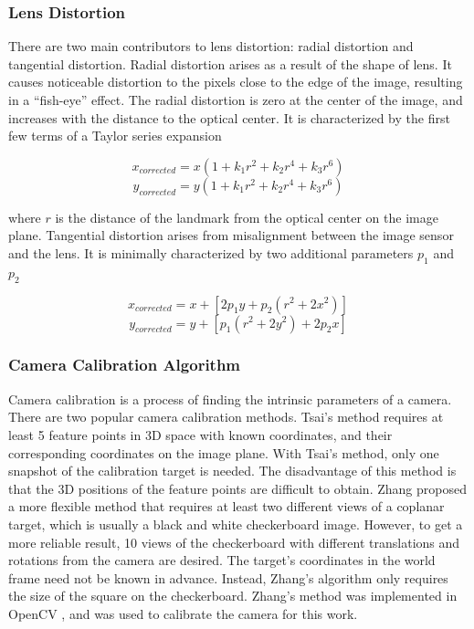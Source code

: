 \subsubsection{Lens Distortion}
There are two main contributors to lens distortion: radial distortion
and tangential distortion. Radial distortion arises as a result of the
shape of lens. It causes noticeable distortion to the pixels close to
the edge of the image, resulting in a ``fish-eye'' effect. The radial
distortion is zero at the center of the image, and increases with the
distance to the optical center. It is characterized by the first few
terms of a Taylor series expansion \cite{bradski_learning_2008}

\begin{equation}x_{corrected} = x(1+k_1r^2+k_2r^4+k_3r^6)\end{equation}
\begin{equation}y_{corrected} = y(1+k_1r^2+k_2r^4+k_3r^6)\end{equation}

\noindent where $r$ is the distance of the landmark from the optical
center on the image plane. Tangential distortion arises from
misalignment between the image sensor and the lens. It is minimally
characterized by two additional parameters $p_1$ and $p_2$
\cite{bradski_learning_2008}

\begin{equation}x_{corrected} = x+[2p_1y+p_2(r^2+2x^2)]\end{equation}
\begin{equation}y_{corrected} = y+[p_1(r^2+2y^2)+2p_2x]\end{equation}

\subsubsection{Camera Calibration Algorithm}
Camera calibration is a process of finding the intrinsic parameters of
a camera. There are two popular camera calibration methods. Tsai's
method \cite{tsai_efficient_1986} requires at least 5 feature points
in 3D space with known coordinates, and their corresponding
coordinates on the image plane. With Tsai's method, only one snapshot
of the calibration target is needed. The disadvantage of this method
is that the 3D positions of the feature points are difficult to
obtain. Zhang \cite{zhang_flexible_2000} proposed a more flexible
method that requires at least two different views of a coplanar
target, which is usually a black and white checkerboard image.
However, to get a more reliable result, 10 views of the checkerboard
with different translations and rotations from the camera are desired.
The target's coordinates in the world frame need not be known in
advance. Instead, Zhang's algorithm only requires the size of the
square on the checkerboard. Zhang's method was implemented in OpenCV
\cite{bradski_learning_2008}, and was used to calibrate the camera for
this work.

